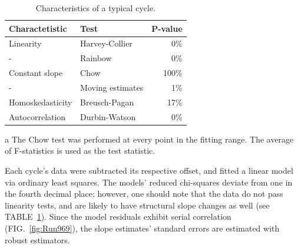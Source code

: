 \documentclass[reprint]{revtex4-1}
\begin{document}
\begin{table}
\centering
\begin{threeparttable}
	\caption{Characteristics of a typical cycle.\label{tbl:CycleChars}}
	\begin{tabular}{llr}
	\hline\hline
	Charactetistic	& Test 					& P-value \\
	\hline
	Linearity 		& Harvey-Collier		& 0\% \\
	-				& Rainbow				& 0\% \\
	Constant slope	& Chow\tnote{a}		 	& 100\% \\
	-				& Moving estimates		& 1\% \\
	Homoskedasticity& Breusch-Pagan 		& 17\% \\
	Autocorrelation & Durbin-Watson			& 0\% \\
	\hline\hline
	\end{tabular}
	\begin{tablenotes}
	\item[a]{The Chow test was performed at every point in the fitting range. The average of F-statistics is used as the test statistic.}
	\end{tablenotes}
\end{threeparttable}
\end{table}

Each cycle's data were subtracted its respective offset, and fitted a linear model via ordinary least squares. The models' reduced chi-squares deviate from one in the fourth decimal place; however, one should note that the data do not pass linearity tests, and are likely to have structural slope changes as well (see TABLE~\ref{tbl:CycleChars}). Since the model residuals exhibit serial correlation (FIG.~\ref{fig:Run969}), the slope estimates' standard errors are estimated with robust estimators.
\end{document}
